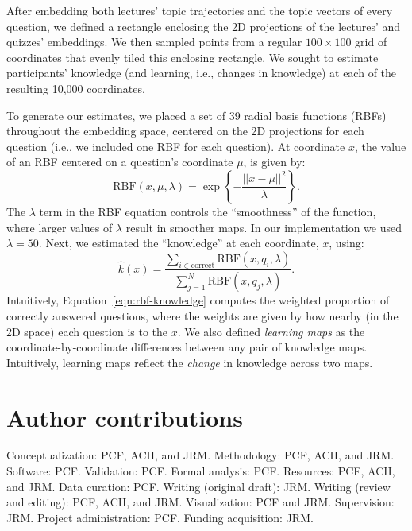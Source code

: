 \documentclass[10pt]{article}
\begin{document}
After embedding both lectures' topic trajectories and the topic vectors of
every question, we defined a rectangle enclosing the 2D projections of the
lectures' and quizzes' embeddings. We then sampled points from a regular $100
\times 100$ grid of coordinates that evenly tiled this enclosing rectangle. We
sought to estimate participants' knowledge (and learning, i.e., changes in
knowledge) at each of the resulting 10,000 coordinates.

To generate our estimates, we placed a set of 39 radial basis functions (RBFs)
throughout the embedding space, centered on the 2D projections for each
question (i.e., we included one RBF for each question). At coordinate $x$, the
value of an RBF centered on a question's coordinate $\mu$, is given by:
\begin{equation}
    \mathrm{RBF}(x, \mu, \lambda) = \exp\left\{-\frac{||x - \mu||^2}{\lambda}\right\}.
    \label{eqn:rbf}
\end{equation}
The $\lambda$ term in the RBF equation controls the ``smoothness'' of the
function, where larger values of $\lambda$ result in smoother maps. In our
implementation we used $\lambda = 50$.  Next, we estimated the ``knowledge''
at each coordinate, $x$, using:
\begin{equation}
    \hat{k}(x) = \frac{\sum_{i \in \mathrm{correct}} \mathrm{RBF}(x, q_i, \lambda)}{\sum_{j = 1}^N \mathrm{RBF}(x, q_j, \lambda)}.
    \label{eqn:rbf-knowledge}
\end{equation}
Intuitively, Equation~\ref{eqn:rbf-knowledge} computes the weighted proportion of
correctly answered questions, where the weights are given by how nearby (in the 2D space)
each question is to the $x$.  We also defined \textit{learning maps} as the coordinate-by-coordinate
differences between any pair of knowledge maps.  Intuitively, learning maps reflect the \textit{change}
in knowledge across two maps.

\section*{Author contributions}

Conceptualization: PCF, ACH, and JRM. Methodology: PCF, ACH, and JRM. Software:
PCF. Validation: PCF. Formal analysis: PCF. Resources: PCF, ACH, and JRM. Data
curation: PCF. Writing (original draft): JRM. Writing (review and editing):
PCF, ACH, and JRM. Visualization: PCF and JRM. Supervision: JRM. Project
administration: PCF. Funding acquisition: JRM.
\end{document}
